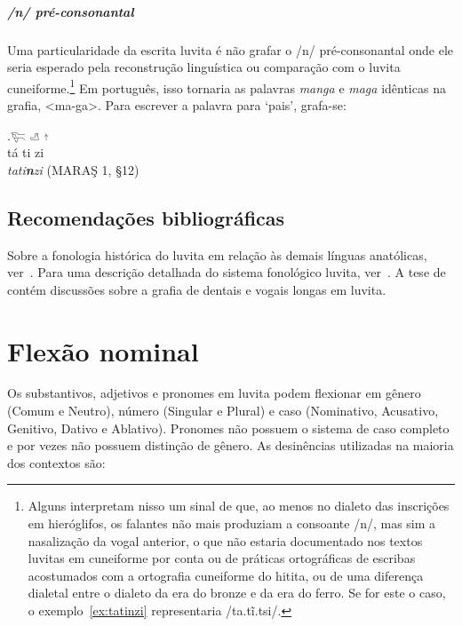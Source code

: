 \paragraph{/n/ pré\hyp{}consonantal}
Uma particularidade da escrita luvita é não grafar o /n/
pré\hyp{}consonantal onde ele seria esperado pela reconstrução linguística ou
comparação com o luvita cuneiforme.\footnote{%
	Alguns interpretam nisso um sinal de que, ao menos no dialeto das inscrições
	em hieróglifos, os falantes não mais produziam a consoante /n/, mas sim
	a nasalização da vogal anterior, o que não estaria documentado nos textos
	luvitas em cuneiforme por conta ou de práticas ortográficas de escribas
	acostumados com a ortografia cuneiforme do hitita, ou de uma diferença
	dialetal entre o dialeto da era do bronze e da era do ferro. Se for este o
	caso, o exemplo~\ref{ex:tatinzi} representaria /ta.tĩ.tsi/.}
Em português, isso tornaria as palavras \emph{manga} e \emph{maga} idênticas na
grafia, <ma-ga>.
Para escrever a palavra para `pais', grafa-se:

\exg.\label{ex:tatinzi}\Large 𔐞 \Large 𔑣 \Large 𔖩\\
tá ti zi\\
\emph{tati\textbf{n}zi}  (MARAŞ 1, §12)



\section{Recomendações bibliográficas}

Sobre a fonologia histórica do luvita em relação às demais línguas anatólicas,
ver~\citet[p. 229ff.]{Melchert1994}.
Para uma descrição detalhada do sistema fonológico luvita,
ver~\citet[p. 177ff.]{MelchertLanguage}.
A tese de~\citet{Vertegaal2020} contém discussões sobre a grafia de dentais e
vogais longas em luvita.

\chapter{Flexão nominal}

Os substantivos, adjetivos e pronomes em luvita podem flexionar em gênero (Comum e Neutro),
número (Singular e Plural) e caso (Nominativo, Acusativo, Genitivo, Dativo e
Ablativo).
Pronomes não possuem o sistema de caso completo e por vezes não possuem
distinção de gênero.
As desinências utilizadas na maioria dos contextos são:

